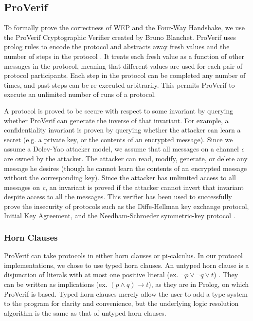 \documentclass[11pt, twocolumn]{article} %
\begin{document}
{\subsection{ProVerif}
To formally prove the correctness of WEP and the Four-Way Handshake, we use the ProVerif Cryptographic Verifier created by Bruno Blanchet.  ProVerif uses prolog rules to encode the protocol and abstracts away fresh values and the number of steps in the protocol \cite{blanchet01}.  It treats each fresh value as a function of other messages in the protocol, meaning that different values are used for each pair of protocol participants.  Each step in the protocol can be completed any number of times, and past steps can be re-executed arbitrarily.  This permits ProVerif to execute an unlimited number of runs of a protocol.  

A protocol is proved to be secure with respect to some invariant by querying  whether ProVerif can generate the inverse of that invariant.  For example, a confidentiality invariant is proven by querying whether the attacker can learn a secret (e.g. a private key, or the contents of an encrypted message). Since we assume a Dolev-Yao attacker model, we assume that all messages on a channel \textit{c} are owned by the attacker.  The attacker can read, modify, generate, or delete any message he desires (though he cannot learn the contents of an encrypted message without the corresponding key). Since the attacker has unlimited access to all messages on \textit{c}, an invariant is proved if the attacker cannot invert that invariant despite access to all the messages. This verifier has been used to successfully prove the insecurity of protocols such as the Diffe-Hellman key exchange protocol, Initial Key Agreement, and the Needham-Schroeder symmetric-key protocol \cite{lafourcade10, abadi}.

\subsubsection{Horn Clauses}
ProVerif can take protocols in either horn clauses or pi-calculus.  In our protocol implementations, we chose to use typed horn clauses.  An untyped horn clause is a disjunction of literals with at most one positive literal (ex. $ \neg p \lor \neg q \lor t$) \cite{blanchet09}.  They can be written as implications (ex. $(p \land q ) \rightarrow t$), as they are in Prolog, on which ProVerif is based. Typed horn clauses merely allow the user to add a type system to the program for clarity and convenience, but the underlying logic resolution algorithm is the same as that of untyped horn clauses.

}
\end{document}
